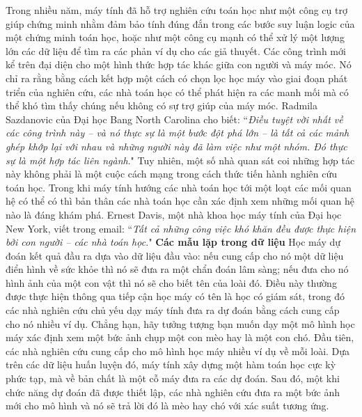 \begin{multicols}{2}
	\vskip 0.05cm
	Trong nhiều năm, máy tính đã hỗ trợ nghiên cứu toán học như một công cụ trợ giúp chứng minh nhằm đảm bảo tính đúng đắn trong các bước suy luận logic của một chứng minh toán học, hoặc như một công cụ mạnh có thể xử lý một lượng lớn các dữ liệu để tìm ra các phản ví dụ cho các giả thuyết.
	\vskip 0.05cm
	Các công trình mới kể trên đại diện cho một hình thức hợp tác khác giữa con người và máy móc. Nó chỉ ra rằng bằng cách kết hợp một cách có chọn lọc học máy vào giai đoạn phát triển của nghiên cứu, các nhà toán học có thể phát hiện ra các manh mối mà có thể khó tìm thấy chúng nếu không có sự trợ giúp của máy móc.
	\vskip 0.05cm
	Radmila Sazdanovic của Đại học Bang North Carolina cho biết: ``\textit{Điều tuyệt vời nhất về các công trình này -- và nó thực sự là một bước đột phá lớn -- là tất cả các mảnh ghép khớp lại với nhau và những người này đã làm việc như một nhóm. Đó thực sự là một hợp tác liên ngành}."
	\vskip 0.05cm
	Tuy nhiên, một số nhà quan sát coi những hợp tác này không phải là một cuộc cách mạng trong cách thức tiến hành nghiên cứu toán học. Trong khi máy tính hướng các nhà toán học tới một loạt các mối quan hệ có thể có thì bản thân các nhà toán học cần xác định xem những mối quan hệ nào là đáng khám phá.
	\vskip 0.05cm
	Ernest Davis, một nhà khoa học máy tính của Đại học New York, viết trong email: ``\textit{Tất cả những công việc khó khăn đều được thực hiện bởi con người -- các nhà toán học.}"
	\vskip 0.05cm
	\textbf{\color{duongvaotoanhoc}Các mẫu lặp trong dữ liệu}
	\vskip 0.05cm
	Học máy dự đoán kết quả đầu ra dựa vào dữ liệu đầu vào: nếu cung cấp cho nó một dữ liệu điển hình về sức khỏe thì nó sẽ đưa ra một chẩn đoán lâm sàng; nếu đưa cho nó hình ảnh của một con vật thì nó sẽ cho biết tên của loài đó.
	\vskip 0.05cm
	Điều này thường được thực hiện thông qua tiếp cận học máy có tên là học có giám sát, trong đó các nhà nghiên cứu chủ yếu dạy máy tính đưa ra dự đoán bằng cách cung cấp cho nó nhiều ví dụ.
	\vskip 0.05cm
	Chẳng hạn, hãy tưởng tượng bạn muốn dạy một mô hình học máy xác định xem một bức ảnh chụp một con mèo hay là một con chó. Đầu tiên, các nhà nghiên cứu cung cấp cho mô hình học máy nhiều ví dụ về mỗi loài. Dựa trên các dữ liệu huấn luyện đó, máy tính xây dựng một hàm toán học cực kỳ phức tạp, mà về bản chất là một cỗ máy đưa ra các dự đoán. Sau đó, một khi chức năng dự đoán đã được thiết lập, các nhà nghiên cứu đưa ra một bức ảnh mới cho mô hình và nó sẽ trả lời đó là mèo hay chó với xác suất tương ứng.
	\begin{figure}[H]
		\centering
		\vspace*{-5pt}

\end{figure}
\end{multicols}

